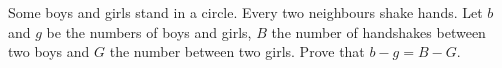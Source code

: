Some boys and girls stand in a circle. Every two neighbours shake hands. Let $b$ and $g$ be the numbers of boys and girls, $B$ the number of handshakes between two boys and $G$ the number between two girls. Prove that $b-g=B-G$.
